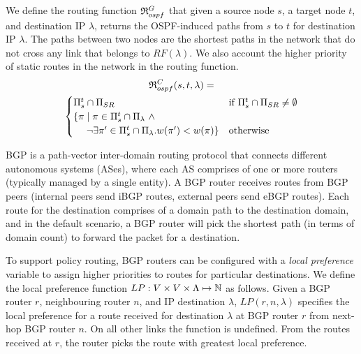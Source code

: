 We define the routing function 
$\mathfrak{R}_{ospf}^G$ 
that given 
a source node $s$,
a target node $t$,
and destination IP 
$\lambda$,
returns the OSPF-induced paths from $s$ to $t$ for destination IP $\lambda$.
The paths between two nodes are
the shortest paths in the network
that do not cross any link that belongs to $RF(\lambda)$. We also
account the higher priority of static routes 
in the network in the routing function.
\begin{multline} \label{eq:ospfmodel}
\mathfrak{R}_{ospf}^C(s,t,\lambda) = \\
\begin{cases}
\text{$\Pi_s^t \cap \Pi_{SR}$}  & \text{if $\Pi_s^t \cap \Pi_{SR} \not=\emptyset$} \\
\text{$\{\pi \mid  \pi\in \Pi_s^t\cap \Pi_\lambda ~\wedge $} & \\
\text{~~~~$\neg\exists \pi'\in\Pi_s^t\cap \Pi_\lambda . w(\pi')< w(\pi)\}$} & \text{otherwise}
\end{cases}
\end{multline}

BGP is a path-vector inter-domain 
routing protocol that connects 
different autonomous systems (ASes), where each AS
comprises of one or more routers (typically managed
by a single entity). A BGP router receives routes 
from BGP peers (internal peers send iBGP routes, 
external peers send eBGP routes). Each route 
for the destination comprises of a domain path
 to the destination domain, and in the default
 scenario, a BGP router will pick the shortest
 path (in terms of domain count) to forward
 the packet for a destination. 
 
To support policy routing, BGP routers can be 
configured with a \emph{local preference} variable
to assign higher priorities to routes for particular
destinations. We define the local preference function 
$LP: V \times V \times \Lambda \mapsto \mathbb{N}$ as follows.
Given a BGP router $r$, neighbouring router $n$,
and IP destination $\lambda$,
  $LP(r, n, \lambda)$ 
specifies the local preference for a route received 
for destination $\lambda$ at BGP router $r$ 
from next-hop BGP router $n$. 
On all other links the function is undefined. From 
the routes received at $r$, the router
picks the route with greatest local preference. 

